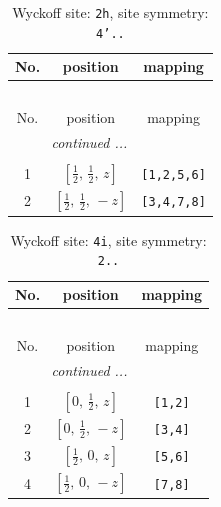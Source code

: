 \documentclass[fleqn,8pt]{jsarticle}
\begin{document}
\begin{longtable}{ccc}
\caption{Wyckoff site: {\tt 2h}, site symmetry: {\tt 4'..}}
 \\
 \hline \hline
No. & position & mapping \\ \hline \endfirsthead

\multicolumn{2}{l}{\tablename\ \thetable{}} \\
 \hline \hline
No. & position & mapping \\ \hline \endhead

 \hline \hline
\multicolumn{2}{r}{\footnotesize\it continued ...} \\ \endfoot

 \hline \hline
\multicolumn{2}{r}{} \\ \endlastfoot

1 & $\left[ \frac{1}{2},\, \frac{1}{2},\, z \right]$ & {\tt [1,2,5,6]} \\ \hline
2 & $\left[ \frac{1}{2},\, \frac{1}{2},\, - z \right]$ & {\tt [3,4,7,8]} \\
\end{longtable}
\renewcommand{\arraystretch}{1.2}
\begin{longtable}{ccc}
\caption{Wyckoff site: {\tt 4i}, site symmetry: {\tt 2..}}
 \\
 \hline \hline
No. & position & mapping \\ \hline \endfirsthead

\multicolumn{2}{l}{\tablename\ \thetable{}} \\
 \hline \hline
No. & position & mapping \\ \hline \endhead

 \hline \hline
\multicolumn{2}{r}{\footnotesize\it continued ...} \\ \endfoot

 \hline \hline
\multicolumn{2}{r}{} \\ \endlastfoot

1 & $\left[ 0,\, \frac{1}{2},\, z \right]$ & {\tt [1,2]} \\ \hline
2 & $\left[ 0,\, \frac{1}{2},\, - z \right]$ & {\tt [3,4]} \\ \hline
3 & $\left[ \frac{1}{2},\, 0,\, z \right]$ & {\tt [5,6]} \\ \hline
4 & $\left[ \frac{1}{2},\, 0,\, - z \right]$ & {\tt [7,8]} \\
\end{longtable}
\renewcommand{\arraystretch}{1.2}
\end{document}
